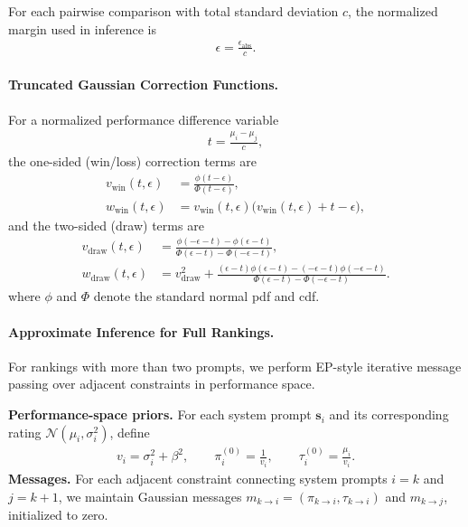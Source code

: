 \documentclass{article}
\theoremstyle{plain}
\theoremstyle{definition}
\theoremstyle{remark}
\begin{document}
For each pairwise comparison with total standard deviation $c$, the normalized margin used in inference is
\begin{align*}
\epsilon = \frac{\epsilon_{\mathrm{abs}}}{c}.
\end{align*}

\paragraph{Truncated Gaussian Correction Functions.}
For a normalized performance difference variable
\begin{align*}
t=\frac{\mu_i-\mu_j}{c},
\end{align*}
the one-sided (win/loss) correction terms are
\begin{align*}
v_{\text{win}}(t,\epsilon) &= \frac{\phi(t-\epsilon)}{\Phi(t-\epsilon)}, \\
w_{\text{win}}(t,\epsilon) &= v_{\text{win}}(t,\epsilon)\big(v_{\text{win}}(t,\epsilon)+t-\epsilon\big),
\end{align*}
and the two-sided (draw) terms are
\begin{align*}
v_{\text{draw}}(t,\epsilon)
&=\frac{\phi(-\epsilon-t)-\phi(\epsilon-t)}
{\Phi(\epsilon-t)-\Phi(-\epsilon-t)}, \\
w_{\text{draw}}(t,\epsilon)
&=v_{\text{draw}}^2+\frac{(\epsilon-t)\phi(\epsilon-t)-(-\epsilon-t)\phi(-\epsilon-t)}
{\Phi(\epsilon-t)-\Phi(-\epsilon-t)} .
\end{align*}
where $\phi$ and $\Phi$ denote the standard normal pdf and cdf.

\paragraph{Approximate Inference for Full Rankings.}
For rankings with more than two prompts, we perform EP-style iterative message passing \cite{minka2001family} over adjacent constraints in performance space.

\textbf{Performance-space priors.}  
For each system prompt $\mathbf{s}_{i}$ and its corresponding rating $\mathcal{N}(\mu_{i}, \sigma_{i}^{2})$, define
\begin{align*}
v_i=\sigma_i^2+\beta^2, \qquad
\pi_i^{(0)}=\frac{1}{v_i}, \qquad
\tau_i^{(0)}=\frac{\mu_i}{v_i}.
\end{align*}
\textbf{Messages.}  
For each adjacent constraint connecting system prompts $i=k$ and $j=k+1$, we maintain Gaussian messages
$m_{k\to i}=(\pi_{k\to i},\tau_{k\to i})$ and $m_{k\to j}$, initialized to zero.
\end{document}
